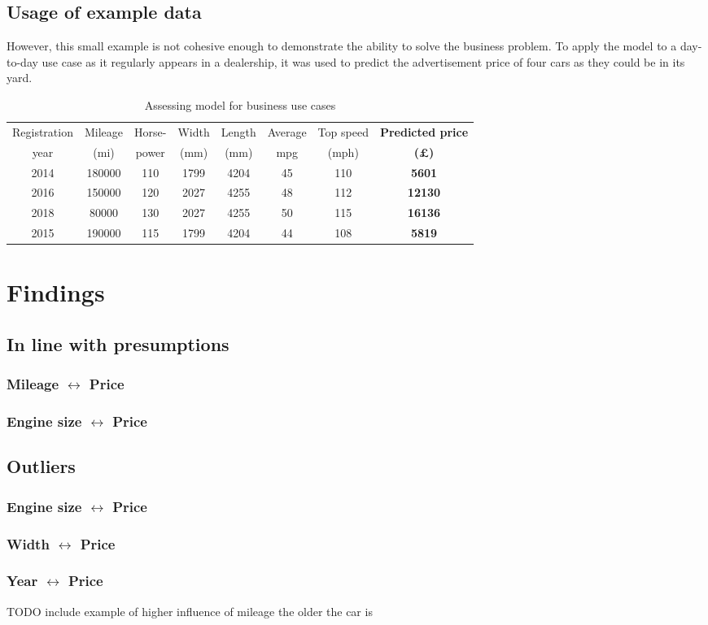 \subsection{Usage of example data}
However, this small example is not cohesive enough to demonstrate the ability to solve the business problem.
To apply the model to a day-to-day use case as it regularly appears in a dealership, it was used to predict the advertisement price
of four cars as they could be in its yard.
\begin{table}[H]
    \begin{adjustbox}{width={\textwidth}}
        \begin{tabular}{|c|c|c|c|c|c|c|c|}
            \hline
            Registration & Mileage & Horse- & Width & Length & Average & Top speed & \textbf{Predicted price} \\[-1ex]
            year         & (mi)    & power  & (mm)  & (mm)   & mpg     & (mph)     & \textbf{(£)}             \\ \hline
            2014         & 180000  & 110    & 1799  & 4204   & 45      & 110       & \textbf{5601}            \\\hline
            2016         & 150000  & 120    & 2027  & 4255   & 48      & 112       & \textbf{12130}           \\\hline
            2018         & 80000   & 130    & 2027  & 4255   & 50      & 115       & \textbf{16136}           \\\hline
            2015         & 190000  & 115    & 1799  & 4204   & 44      & 108       & \textbf{5819}            \\ \hline
        \end{tabular}
    \end{adjustbox}
    \caption{Assessing model for business use cases}
    \label{predicted_price_realworld_data}
\end{table}
\section{Findings}
\subsection{In line with presumptions}
\subsubsection{Mileage $\leftrightarrow$ Price}
\subsubsection{Engine size $\leftrightarrow$ Price}

\subsection{Outliers}
\subsubsection{Engine size $\leftrightarrow$ Price}
\subsubsection{Width $\leftrightarrow$ Price}
\subsubsection{Year $\leftrightarrow$ Price} \label{year_to_price_correlation}
TODO include example of higher influence of mileage the older the car is
